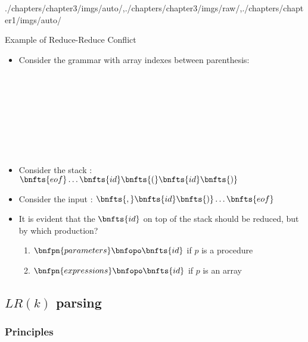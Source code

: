 \begin{graphicspathcontext}{{./chapters/chapter3/imgs/auto/},{./chapters/chapter3/imgs/raw/},{./chapters/chapter1/imgs/auto/}}
\begin{bibunit}[apalike]
\begin{frame}[t]{Example of Reduce-Reduce Conflict}	
	\begin{itemize}
	\item Consider the grammar with array indexes between parenthesis:
		\begin{footnotesize}\begin{bnf}
			 \\
			 \\
			 \\
			 \\
			 \\
			 \\
			 \\
		\end{bnf}\end{footnotesize}
	\vspace{-.75cm}
	\item Consider the stack : $\bnfts{eof} \dots \bnfts{id} \bnfts{(} \bnfts{id} \bnfts{)}$
	\item Consider the input : $\bnfts{,} \bnfts{id} \bnfts{)} \dots \bnfts{eof}$
	\item It is evident that the $\bnfts{id}$ on top of the stack should be reduced, but by which production?
		\begin{enumerate}
		\item $\bnfpn{parameters} \bnfopo \bnfts{id}$ if $p$ is a procedure
		\item $\bnfpn{expressions} \bnfopo \bnfts{id}$ if $p$ is an array
		\end{enumerate}
	\end{itemize}
\end{frame}

\subsection{$LR(k)$ parsing}
\subsectiontableofcontentslide*

\subsubsection{Principles}


\end{bibunit}
\end{graphicspathcontext}
